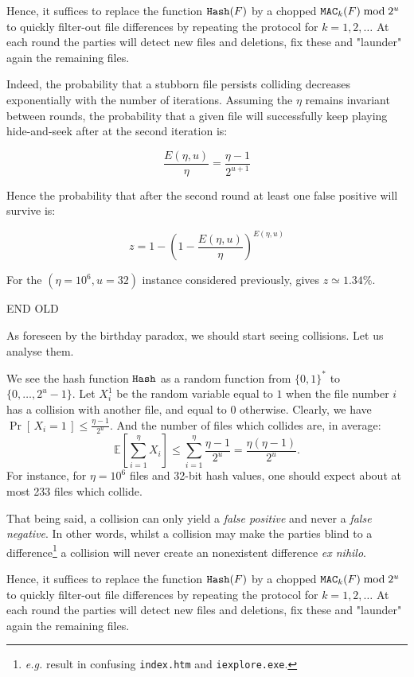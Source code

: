 \documentclass[11pt]{llncs}
\newcommand{\Prob}[1]{{\Pr\left[\,{#1}\,\right]}}
\newcommand{\EE}[1]{{\mathbb{E}\left[{#1}\right]}}
\begin{document}
Hence, it suffices to replace the function $\mbox{{\tt Hash}}(F)$ by a chopped $\mbox{{\tt MAC}}_k(F) \bmod 2^u$ to quickly filter-out file differences by repeating the protocol for $k=1,2,\ldots$ At each round the parties will detect new files and deletions, fix these and "launder" again the remaining files.\smallskip

Indeed, the probability that a stubborn file persists colliding decreases exponentially with the number of iterations. Assuming the $\eta$ remains invariant between rounds, the probability that a given file will successfully keep playing hide-and-seek after at the second iteration is:

$$
\frac{E(\eta,u)}{\eta}=\frac{\eta-1}{2^{u+1}}
$$

Hence the probability that after the second round at least one false positive will survive is:

$$
z=1-(1-\frac{E(\eta,u)}{\eta})^{E(\eta,u)}
$$

For the $(\eta=10^6,u=32)$ instance considered previously, gives $z\simeq 1.34\%$.

{\Large END OLD}

As foreseen by the birthday paradox, we should start seeing collisions.
Let us analyse them.

We see the hash function $\mbox{{\tt Hash}}$ as a random function from $\{0,1\}^*$ to $\{0,\dots,2^u-1\}$.
Let $X^1_i$ be the random variable equal to $1$ when the file number $i$ has a collision with another file, and equal to $0$ otherwise.
Clearly, we have $\Prob{X_i = 1} \le \frac{\eta -1}{2^u}$.
And the number of files which collides are, in average:
\[ \EE{\sum_{i=1}^{\eta} X_i} \le \sum_{i=1}^\eta \frac{\eta -1}{2^u} = \frac{\eta (\eta - 1)}{2^u}. \]
For instance, for $\eta=10^6$ files and 32-bit hash values, one should expect about at most 233 files which collide.\smallskip

That being said, a collision can only yield a {\sl false positive} and never a {\sl false negative}. In other words, whilst a collision may make the parties blind to a difference\footnote{{\sl e.g.} result in confusing {\tt index.htm} and {\tt iexplore.exe}.} a collision will never create an nonexistent difference {\sl ex nihilo}.\smallskip

Hence, it suffices to replace the function $\mbox{{\tt Hash}}(F)$ by a chopped $\mbox{{\tt MAC}}_k(F) \bmod 2^u$ to quickly filter-out file differences by repeating the protocol for $k=1,2,\ldots$ At each round the parties will detect new files and deletions, fix these and "launder" again the remaining files.\smallskip
\end{document}
